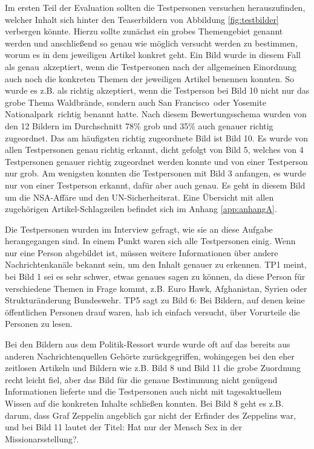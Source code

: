 \documentclass[12pt,a4paper,bibtotoc,abstracton]{scrartcl}
\begin{document}
Im ersten Teil der Evaluation sollten die Testpersonen versuchen herauszufinden, welcher Inhalt sich hinter den Teaserbildern von Abbildung \ref{fig:testbilder} verbergen könnte. Hierzu sollte zunächst ein grobes Themengebiet genannt werden und anschließend so genau wie möglich versucht werden zu bestimmen, worum es in dem jeweiligen Artikel konkret geht. Ein Bild wurde in diesem Fall als \glqq genau\grqq\ akzeptiert, wenn die Testpersonen nach der allgemeinen Einordnung auch noch die konkreten Themen der jeweiligen Artikel benennen konnten. So wurde es z.B. als richtig akzeptiert, wenn die Testperson bei Bild 10 nicht nur das grobe Thema \glqq Waldbrände\grqq, sondern auch \glqq San Francisco\grqq\ oder \glqq Yosemite Nationalpark\grqq\ richtig benannt hatte. Nach diesem Bewertungsschema wurden von den 12 Bildern im Durchschnitt 78\% grob und 35\% auch genauer richtig zugeordnet. Das am häufigsten richtig zugeordnete Bild ist Bild 10. Es wurde von allen Testpersonen genau richtig erkannt, dicht gefolgt von Bild 5, welches von 4 Testpersonen genauer richtig zugeordnet werden konnte und von einer Testperson nur grob. Am wenigsten konnten die Testpersonen mit Bild 3 anfangen, es wurde nur von einer Testperson erkannt, dafür aber auch genau. Es geht in diesem Bild um die NSA-Affäre und den UN-Sicherheitsrat. Eine Übersicht mit allen zugehörigen Artikel-Schlagzeilen befindet sich im Anhang \ref{app:anhangA}.

Die Testpersonen wurden im Interview gefragt, wie sie an diese Aufgabe herangegangen sind. In einem Punkt waren sich alle Testpersonen einig. Wenn nur eine Person abgebildet ist, müssen weitere Informationen über andere Nachrichtenkanäle bekannt sein, um den Inhalt genauer zu erkennen. TP1 meint, bei Bild 1 sei es sehr schwer, etwas genaues sagen zu können, da diese Person für verschiedene Themen in Frage kommt, z.B. Euro Hawk, Afghanistan, Syrien oder Strukturänderung Bundeswehr. TP5 sagt zu Bild 6: \glqq Bei Bildern, auf denen keine öffentlichen Personen drauf waren, hab ich einfach versucht, über Vorurteile die Personen zu lesen\grqq. 

Bei den Bildern aus dem Politik-Ressort wurde wurde oft auf das bereits aus anderen Nachrichtenquellen Gehörte zurückgegriffen, wohingegen bei den eher zeitlosen Artikeln und Bildern wie z.B. Bild 8 und Bild 11 die grobe Zuordnung recht leicht fiel, aber das Bild für die genaue Bestimmung nicht genügend Informationen lieferte und die Testpersonen auch nicht mit tagesaktuellem Wissen auf die konkreten Inhalte schließen konnten. Bei Bild 8 geht es z.B. darum, dass Graf Zeppelin angeblich gar nicht der Erfinder des Zeppelins war, und bei Bild 11 lautet der Titel: \glqq Hat nur der Mensch Sex in der Missionarsstellung?\grqq. 
\end{document}
